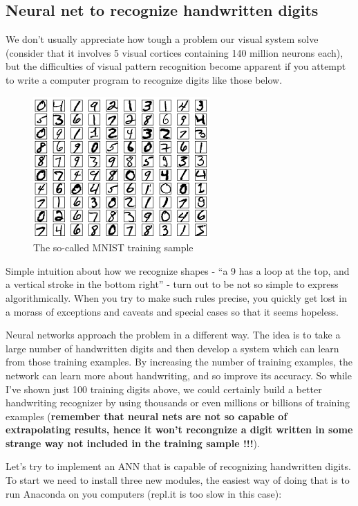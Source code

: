\documentclass[11pt]{article}
\begin{document}
\hypertarget{neural-net-to-recognize-handwritten-digits}{%
\subsection{Neural net to recognize handwritten
digits}\label{neural-net-to-recognize-handwritten-digits}}

We don't usually appreciate how tough a problem our visual system solve
(consider that it involves 5 visual cortices containing 140 million
neurons each), but the difficulties of visual pattern recognition become
apparent if you attempt to write a computer program to recognize digits
like those below.

\begin{figure}
\centering
\includegraphics{mnist_100_digits.png}
\caption{The so-called MNIST training sample}
\end{figure}

Simple intuition about how we recognize shapes - ``a 9 has a loop at the
top, and a vertical stroke in the bottom right'' - turn out to be not so
simple to express algorithmically. When you try to make such rules
precise, you quickly get lost in a morass of exceptions and caveats and
special cases so that it seems hopeless.

Neural networks approach the problem in a different way. The idea is to
take a large number of handwritten digits and then develop a system
which can learn from those training examples. By increasing the number
of training examples, the network can learn more about handwriting, and
so improve its accuracy. So while I've shown just 100 training digits
above, we could certainly build a better handwriting recognizer by using
thousands or even millions or billions of training examples
(\textbf{remember that neural nets are not so capable of extrapolating
results, hence it won't recongnize a digit written in some strange way
not included in the training sample !!!}).

Let's try to implement an ANN that is capable of recognizing handwritten
digits. To start we need to install three new modules, the easiest way
of doing that is to run Anaconda on you computers (repl.it is too slow
in this case):
\end{document}
